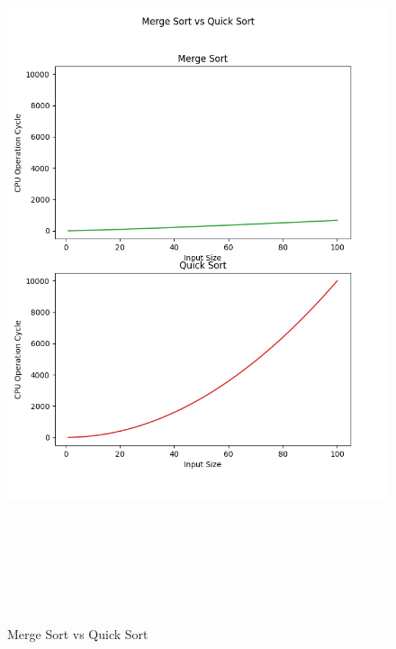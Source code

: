 \documentclass{article}
\begin{document}
\begin{figure}[h]
    \centerline{\includegraphics[width=7in,height=8.5in]{Merge Sort_Quick Sort.png}}
    \caption{Merge Sort vs Quick Sort}
\end{figure}
\end{document}
